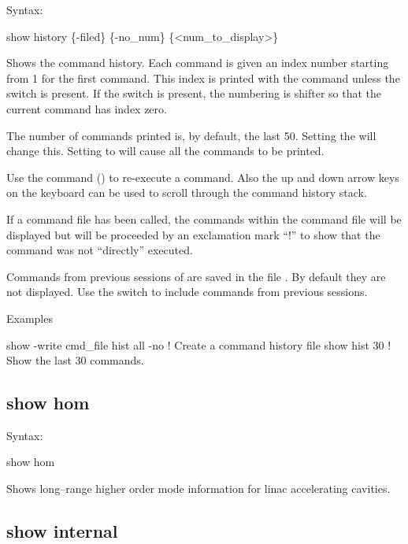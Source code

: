 {{{{{{{{Syntax:
\begin{example}
  show history \{-filed\} \{-no_num\} \{<num_to_display>\}
\end{example}

Shows the command history. Each command is given an index number starting from 1 for the first
command. This index is printed with the command unless the  switch is present. If the
 switch is present, the numbering is shifter so that the current  command
has index zero.

The number of commands printed is, by default, the last 50. Setting the  will
change this. Setting  to   will cause all the commands to be printed.

Use the command  () to re-execute a command. Also the up and down
arrow keys on the keyboard can be used to scroll through the command history stack.

If a command file has been called, the commands within the command file will be displayed but will
be proceeded by an exclamation mark ``!'' to show that the command was not ``directly'' executed.

Commands from previous sessions of \tao are saved in the file . By default they
are not displayed. Use the  switch to include commands from previous sessions.

Examples
\begin{example}
  show -write cmd_file hist all -no   ! Create a command history file
  show hist 30                        ! Show the last 30 commands.
\end{example}


\subsection{show hom}
\label{s:show.hom}

Syntax:
\begin{example}
  show hom
\end{example}

Shows long--range higher order mode information for linac accelerating
cavities.


\subsection{show internal}
\label{s:show.internal}

}}}}}}}}
